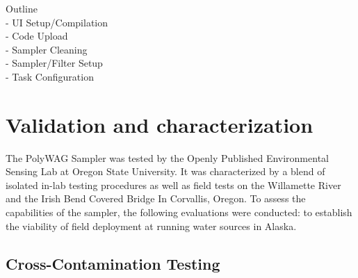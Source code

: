 \documentclass[11pt, letterpaper]{article}
\begin{document}

Outline\\
 - UI Setup/Compilation \\
 - Code Upload\\
 - Sampler Cleaning\\
 - Sampler/Filter Setup\\
 - Task Configuration\\



\section{Validation and characterization}


The PolyWAG Sampler was tested by the Openly Published Environmental Sensing Lab at Oregon State University. It was characterized by a blend of isolated in-lab testing procedures as well as field tests on the Willamette River and the Irish Bend Covered Bridge In Corvallis, Oregon. To assess the capabilities of the sampler, the following evaluations were conducted: to establish the viability of field deployment at running water sources in Alaska.

\subsection{Cross-Contamination Testing}
\end{document}
